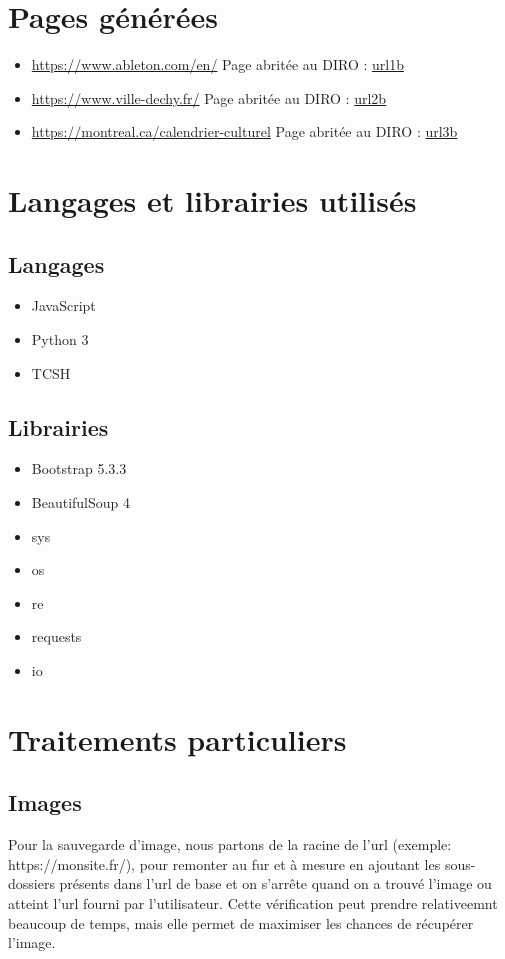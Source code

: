 \documentclass{article}
\begin{document}
\section{Pages générées}
\begin{itemize}
  \item \url{https://www.ableton.com/en/} \qquad Page abritée au DIRO : \url{url1b}
  \item \url{https://www.ville-dechy.fr/} \qquad Page abritée au DIRO : \url{url2b}
  \item \url{https://montreal.ca/calendrier-culturel} \qquad Page abritée au DIRO : \url{url3b}
\end{itemize}
\section{Langages et librairies utilisés}
\subsection{Langages}
\begin{itemize}
  \item JavaScript
  \item Python 3
  \item TCSH
\end{itemize}
\newpage
\subsection{Librairies}
\begin{itemize}  
  \item Bootstrap 5.3.3
  \item BeautifulSoup 4
  \item sys
  \item os
  \item re
  \item requests
  \item io
\end{itemize}

\section{Traitements particuliers}

\subsection{Images}
Pour la sauvegarde d’image, nous partons de la racine de l’url (exemple: https://monsite.fr/), 
pour remonter au fur et à mesure en ajoutant les sous-dossiers présents dans l’url de base et on s’arrête quand on a trouvé l’image ou atteint l’url fourni par l’utilisateur.
Cette vérification peut prendre relativeemnt beaucoup de temps, mais elle permet de maximiser les chances de récupérer l’image.
\end{document}
